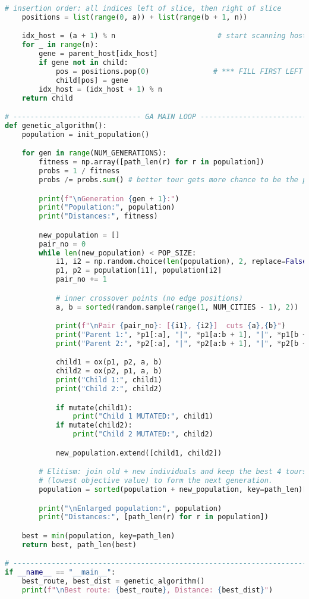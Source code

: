 \documentclass[a4paper,12pt]{article}
\begin{document}
\begin{lstlisting}[language=Python]
    # insertion order: all indices left of slice, then right of slice
    positions = list(range(0, a)) + list(range(b + 1, n))

    idx_host = (a + 1) % n                        # start scanning host
    for _ in range(n):
        gene = parent_host[idx_host]
        if gene not in child:
            pos = positions.pop(0)               # *** FILL FIRST LEFT STAR ***
            child[pos] = gene
        idx_host = (idx_host + 1) % n
    return child

# ------------------------------ GA MAIN LOOP -------------------------------- #
def genetic_algorithm():
    population = init_population()

    for gen in range(NUM_GENERATIONS):
        fitness = np.array([path_len(r) for r in population])
        probs = 1 / fitness
        probs /= probs.sum() # better tour gets more chance to be the parent

        print(f"\nGeneration {gen + 1}:")
        print("Population:", population)
        print("Distances:", fitness)

        new_population = []
        pair_no = 0
        while len(new_population) < POP_SIZE:
            i1, i2 = np.random.choice(len(population), 2, replace=False, p=probs)
            p1, p2 = population[i1], population[i2]
            pair_no += 1

            # inner crossover points (no edge positions)
            a, b = sorted(random.sample(range(1, NUM_CITIES - 1), 2))

            print(f"\nPair {pair_no}: [{i1}, {i2}]  cuts {a},{b}")
            print("Parent 1:", *p1[:a], "|", *p1[a:b + 1], "|", *p1[b + 1:])
            print("Parent 2:", *p2[:a], "|", *p2[a:b + 1], "|", *p2[b + 1:])

            child1 = ox(p1, p2, a, b)
            child2 = ox(p2, p1, a, b)
            print("Child 1:", child1)
            print("Child 2:", child2)

            if mutate(child1):
                print("Child 1 MUTATED:", child1)
            if mutate(child2):
                print("Child 2 MUTATED:", child2)

            new_population.extend([child1, child2])

        # Elitism: join old + new individuals and keep the best 4 tours
        # (lowest objective value) to form the next generation.
        population = sorted(population + new_population, key=path_len)[:POP_SIZE]

        print("\nEnlarged population:", population)
        print("Distances:", [path_len(r) for r in population])

    best = min(population, key=path_len)
    return best, path_len(best)

# --------------------------------------------------------------------------- #
if __name__ == "__main__":
    best_route, best_dist = genetic_algorithm()
    print(f"\nBest route: {best_route}, Distance: {best_dist}")

\end{lstlisting}
\end{document}
